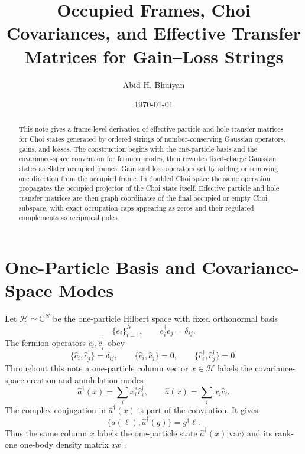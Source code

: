 \documentclass[aps,prb,onecolumn,nofootinbib,superscriptaddress]{revtex4-2}
\newcommand{\cH}{\mathcal H}
\newcommand{\vac}{\mathrm{vac}}
\newcommand{\ket}[1]{\lvert #1\rangle}
\newcommand{\ahat}{\hat a}
\newcommand{\chat}{\hat c}
\begin{document}
\title{Occupied Frames, Choi Covariances, and Effective Transfer Matrices for Gain--Loss Strings}
\author{Abid H. Bhuiyan}
\date{\today}

\begin{abstract}
This note gives a frame-level derivation of effective particle and hole
transfer matrices for Choi states generated by ordered strings of
number-conserving Gaussian operators, gains, and losses.  The construction
begins with the one-particle basis and the covariance-space convention for
fermion modes, then rewrites fixed-charge Gaussian states as Slater occupied
frames.  Gain and loss operators act by adding or removing one direction from
the occupied frame.  In doubled Choi space the same operation propagates the
occupied projector of the Choi state itself.  Effective particle and hole
transfer matrices are then graph coordinates of the final occupied or empty
Choi subspace, with exact occupation caps appearing as zeros and their
regulated complements as reciprocal poles.
\end{abstract}

\maketitle
\setcounter{tocdepth}{2}
\tableofcontents

\section{One-Particle Basis and Covariance-Space Modes}

Let \(\cH\simeq \mathbb C^N\) be the one-particle Hilbert space with fixed
orthonormal basis
\begin{equation}
  \{e_i\}_{i=1}^N,\qquad e_i^\dagger e_j=\delta_{ij}.
\end{equation}
The fermion operators \(\chat_i,\chat_i^\dagger\) obey
\begin{equation}
  \{\chat_i,\chat_j^\dagger\}=\delta_{ij},\qquad
  \{\chat_i,\chat_j\}=0,\qquad
  \{\chat_i^\dagger,\chat_j^\dagger\}=0 .
\end{equation}
Throughout this note a one-particle column vector \(x\in\cH\) labels the
covariance-space creation and annihilation modes
\begin{equation}
  \ahat^\dagger(x)=\sum_i x_i^*\chat_i^\dagger,\qquad
  \ahat(x)=\sum_i x_i\chat_i .
  \label{eq:modes}
\end{equation}
The complex conjugation in \(\ahat^\dagger(x)\) is part of the convention.
It gives
\begin{equation}
  \{\ahat(\ell),\ahat^\dagger(g)\}=g^\dagger \ell .
  \label{eq:mode-car}
\end{equation}
Thus the same column \(x\) labels the one-particle state
\(\ahat^\dagger(x)\ket{\vac}\) and its rank-one one-body density matrix
\(xx^\dagger\).
\end{document}
